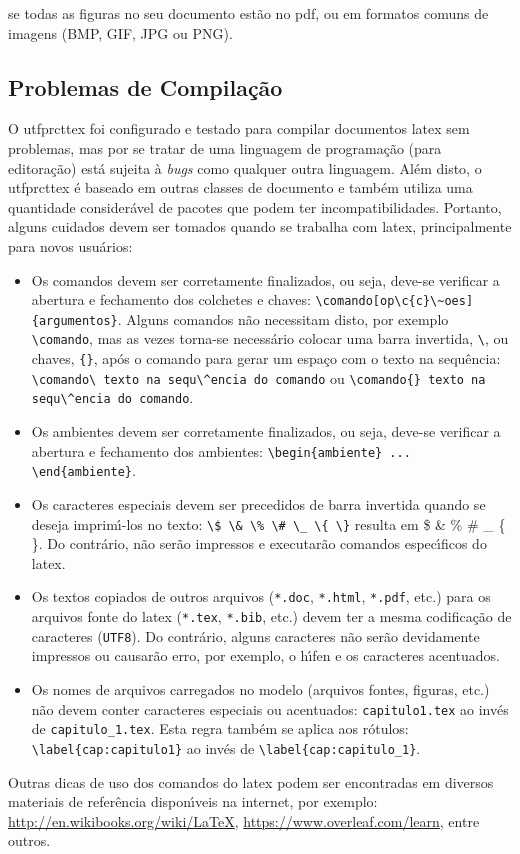 \noindent se todas as figuras no seu documento est\~ao no \gls{pdf}, ou em formatos comuns de imagens (BMP, GIF, JPG ou PNG).

\subsection{Problemas de Compila\c{c}\~ao}\label{sec:problemas}

O \gls{utfprcttex} foi configurado e testado para compilar documentos \gls{latex} sem problemas, mas por se tratar de uma linguagem de programa\c{c}\~ao (para editora\c{c}\~ao) est\'a sujeita \`a \textit{bugs} como qualquer outra linguagem. Al\'em disto, o \gls{utfprcttex} \'e baseado em outras classes de documento e tamb\'em utiliza uma quantidade consider\'avel de pacotes que podem ter incompatibilidades. Portanto, alguns cuidados devem ser tomados quando se trabalha com \gls{latex}, principalmente para novos usu\'arios:

\begin{itemize}%
\item Os comandos devem ser corretamente finalizados, ou seja, deve-se verificar a abertura e fechamento dos colchetes e chaves: \verb|\comando[op\c{c}\~oes]{argumentos}|. Alguns comandos n\~ao necessitam disto, por exemplo \verb|\comando|, mas as vezes torna-se necess\'ario colocar uma barra invertida, \verb|\|, ou chaves, \verb|{}|, ap\'os o comando para gerar um espa\c{c}o com o texto na sequ\^encia: \verb|\comando\ texto na sequ\^encia do comando| ou \verb|\comando{} texto na sequ\^encia do comando|.
\item Os ambientes devem ser corretamente finalizados, ou seja, deve-se verificar a abertura e fechamento dos ambientes: \verb|\begin{ambiente} ... \end{ambiente}|.
\item Os caracteres especiais devem ser precedidos de barra invertida quando se deseja imprim\'{\i}-los no texto: \verb|\$ \& \% \# \_ \{ \}| resulta em \$ \& \% \# \_ \{ \}. Do contr\'ario, n\~ao ser\~ao impressos e executar\~ao comandos espec\'{\i}ficos do \gls{latex}.
\item Os textos copiados de outros arquivos (\texttt{*.doc}, \texttt{*.html}, \texttt{*.pdf}, etc.) para os arquivos fonte do \gls{latex} (\texttt{*.tex}, \texttt{*.bib}, etc.) devem ter a mesma codifica\c{c}\~ao de caracteres (\texttt{UTF8}). Do contr\'ario, alguns caracteres n\~ao ser\~ao devidamente impressos ou causar\~ao erro, por exemplo, o h\'{\i}fen e os caracteres acentuados.
\item Os nomes de arquivos carregados no modelo (arquivos fontes, figuras, etc.) n\~ao devem conter caracteres especiais ou acentuados: \verb|capitulo1.tex| ao inv\'es de \verb|capitulo_1.tex|. Esta regra tamb\'em se aplica aos r\'otulos: \verb|\label{cap:capitulo1}| ao inv\'es de \verb|\label{cap:capitulo_1}|.
\end{itemize}

Outras dicas de uso dos comandos do \gls{latex} podem ser encontradas em diversos materiais de refer\^encia dispon\'{\i}veis na internet, por exemplo: \url{http://en.wikibooks.org/wiki/LaTeX}, \url{https://www.overleaf.com/learn}, entre outros.
